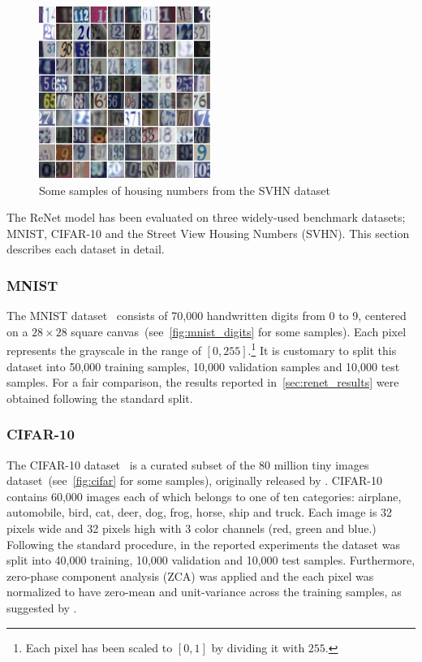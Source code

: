 \begin{figure}[!t]
    \centering
    \includegraphics[width=0.5\textwidth]{img/renet/SVHN.png}
    \caption{Some samples of housing numbers from the SVHN dataset}
    \label{fig:svhn}
\end{figure}

The ReNet model has been evaluated on three widely-used benchmark datasets;
MNIST, CIFAR-10 and the Street View Housing Numbers (SVHN). This section
describes each dataset in detail.

\subsubsection{MNIST}
The MNIST dataset~\citep{Lecun99objectrecognition} consists of 70,000
handwritten digits from 0 to 9, centered on a $28\times 28$ square
canvas~(see~\autoref{fig:mnist_digits} for some samples). Each pixel represents
the grayscale in the range of $\left[0, 255\right]$.\footnote{Each pixel has
been scaled to $[0, 1]$ by dividing it with $255$.} It is customary to split
this dataset into 50,000 training samples, 10,000 validation samples and 10,000
test samples. For a fair comparison, the results reported
in~\autoref{sec:renet_results} were obtained following the standard split.

\subsubsection{CIFAR-10}
The CIFAR-10 dataset~\citep{KrizhevskyHinton2009} is a curated subset of the 80
million tiny images dataset~(see~\autoref{fig:cifar} for some samples),
originally released by \citet{Torralba+Fergus+Freeman-2008}. CIFAR-10 contains
60,000 images each of which belongs to one of ten categories: airplane,
automobile, bird, cat, deer, dog, frog, horse, ship and truck. Each image is 32
pixels wide and 32 pixels high with 3 color channels (red, green and blue.)
Following the standard procedure, in the reported experiments the dataset
was split into 40,000 training, 10,000 validation and 10,000 test samples.
Furthermore, zero-phase component analysis (ZCA) was applied and the each pixel
was normalized to have zero-mean and unit-variance across the training samples,
as suggested by \citet{KrizhevskyHinton2009}.


